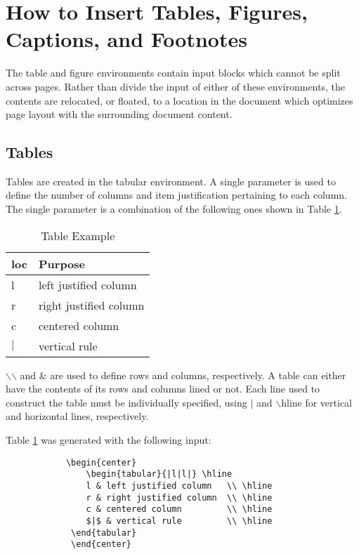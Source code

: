 \section{How to Insert Tables, Figures, Captions, and Footnotes}
 The table and figure environments contain input blocks which cannot be split across pages.  Rather than divide the input of either of these
 environments, the contents are relocated, or floated, to a location in the document which optimizes page layout with the surrounding document content.

\subsection{Tables}
 Tables are created in the tabular environment. A single parameter is used to define the number of columns and item justification pertaining to each column.  The single parameter is a combination of the following ones shown in Table \ref{tb:example1}.
 \\
\begin{table}
 \begin{center}
 \begin{tabular}{|l|l|} \hline
    \textbf{loc}    &   \textbf{Purpose}        \\ \hline
    l               &   left justified column   \\ \hline
    r               &   right justified column  \\ \hline
    c               &   centered column         \\ \hline
    $|$             &   vertical rule           \\ \hline
 \end{tabular}
 \end{center}
 \caption{Table Example}
 \label{tb:example1}
\end{table}
$\backslash$$\backslash$ and \& are used to define rows and columns, respectively.  A table can either have the contents of its rows and columns lined or not.  Each line used to construct the table must be individually specified, using $|$ and $\backslash$hline for vertical and horizontal lines, respectively.

Table \ref{tb:example1} was generated with the following input:

\begin{verbatim}
            \begin{center}
                \begin{tabular}{|l|l|} \hline
                l & left justified column   \\ \hline
                r & right justified column  \\ \hline
                c & centered column         \\ \hline
                $|$ & vertical rule         \\ \hline
             \end{tabular}
             \end{center}
\end{verbatim}

